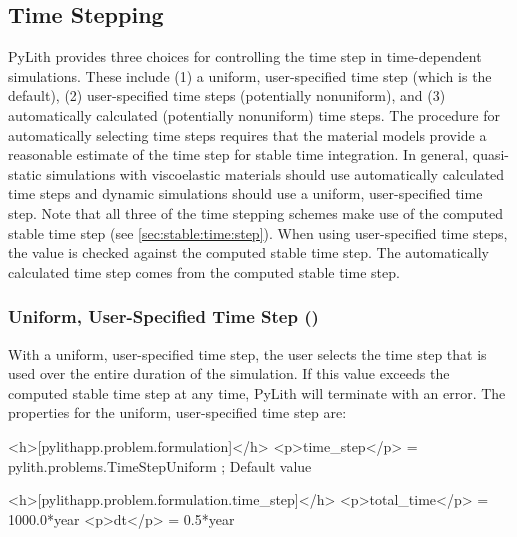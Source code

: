 \subsection{Time Stepping}
\label{sec:time-stepping}

PyLith provides three choices for controlling the time step in time-dependent
simulations. These include (1) a uniform, user-specified time step
(which is the default), (2) user-specified time steps (potentially
nonuniform), and (3) automatically calculated (potentially nonuniform)
time steps. The procedure for automatically selecting time steps requires
that the material models provide a reasonable estimate of the time
step for stable time integration. In general, quasi-static simulations
with viscoelastic materials should use automatically calculated time
steps and dynamic simulations should use a uniform, user-specified
time step. Note that all three of the time stepping schemes make use
of the computed stable time step (see \vref{sec:stable:time:step}).
When using user-specified time steps, the value is checked against
the computed stable time step. The automatically calculated time step
comes from the computed stable time step.


\subsubsection{Uniform, User-Specified Time Step ()}

With a uniform, user-specified time step, the user selects the time
step that is used over the entire duration of the simulation. If this
value exceeds the computed stable time step at any time, PyLith will
terminate with an error. The properties for the uniform, user-specified
time step are:
\begin{inventory}
\end{inventory}

\begin{cfg}
<h>[pylithapp.problem.formulation]</h>
<p>time_step</p> = pylith.problems.TimeStepUniform ; Default value

<h>[pylithapp.problem.formulation.time_step]</h>
<p>total_time</p> = 1000.0*year
<p>dt</p> = 0.5*year
\end{cfg}

